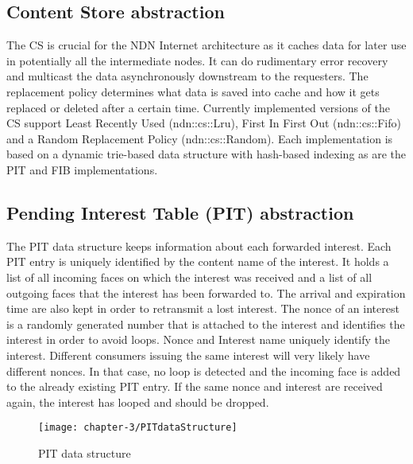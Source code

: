 \subsection{Content Store abstraction}

The CS is crucial for the NDN Internet architecture as it caches data for later use in potentially all the intermediate nodes. It can do rudimentary error recovery and multicast the data asynchronously downstream to the requesters. The replacement policy determines what data is saved into cache and how it gets replaced or deleted after a certain time. Currently implemented versions of the CS support Least Recently Used (ndn::cs::Lru), First In First Out (ndn::cs::Fifo) and a Random Replacement Policy (ndn::cs::Random). Each implementation is based on a dynamic trie-based data structure with hash-based indexing as are the PIT and FIB implementations.

\subsection{Pending Interest Table (PIT) abstraction}

The PIT data structure keeps information about each forwarded interest. Each PIT entry is uniquely identified by the content name of the interest. It holds a list of all incoming faces on which the interest was received and a list of all outgoing faces that the interest has been forwarded to. The arrival and expiration time are also kept in order to retransmit a lost interest. The nonce of an interest is a randomly generated number that is attached to the interest and identifies the interest in order to avoid loops. Nonce and Interest name uniquely identify the interest. Different consumers issuing the same interest will very likely have different nonces. In that case, no loop is detected and the incoming face is added to the already existing PIT entry. If the same nonce and interest are received again, the interest has looped and should be dropped.

\begin{figure}[H]
  \centering
  \texttt{[image: chapter-3/PITdataStructure]}
  \caption{PIT data structure}
  \label{fig:PITdataStructure}
\end{figure}

